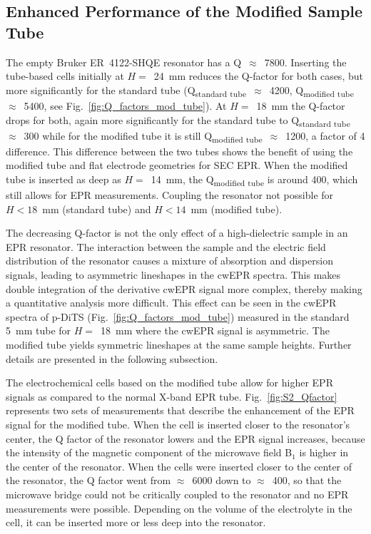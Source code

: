 \subsection{Enhanced Performance of the Modified Sample Tube}\label{Q-factor_SNR}

The empty Bruker ER~4122-SHQE resonator has a Q~$\approx$~7800. Inserting the tube-based cells initially at $H=$~24~mm reduces the Q-factor for both cases, but more significantly for the standard tube (Q\textsubscript{standard tube}~$\approx$~4200, Q\textsubscript{modified tube}~$\approx$~5400, see Fig.~\ref{fig:Q_factors_mod_tube}). At $H=$~18~mm the Q-factor drops for both, again more significantly for the standard tube to Q\textsubscript{standard tube}~$\approx$~300 while for the modified tube it is still Q\textsubscript{modified tube}~$\approx$~1200, a factor of 4 difference. This difference between the two tubes shows the benefit of using the modified tube and flat electrode geometries for SEC EPR. When the modified tube is inserted as deep as $H=$~14~mm, the Q\textsubscript{modified tube} is around 400, which still allows for EPR measurements. Coupling the resonator not possible for $H<18$~mm (standard tube) and $H<14$~mm (modified tube).

\par
The decreasing Q-factor is not the only effect of a high-dielectric sample in an EPR resonator. The interaction between the sample and the electric field distribution of the resonator causes a mixture of absorption and dispersion signals, leading to asymmetric lineshapes in the cwEPR spectra. This makes double integration of the derivative cwEPR signal more complex, thereby making a quantitative analysis more difficult. This effect can be seen in the cwEPR spectra of p-DiTS (Fig.~\ref{fig:Q_factors_mod_tube}) measured in the standard 5~mm tube for $H=$~18~mm where the cwEPR signal is asymmetric. The modified tube yields symmetric lineshapes at the same sample heights. Further details are presented in the following subsection.

\par

The electrochemical cells based on the modified tube allow for higher EPR signals as compared to the normal X-band EPR tube. Fig.~\ref{fig:S2_Qfactor} represents two sets of measurements that describe the enhancement of the EPR signal for the modified tube. When the cell is inserted closer to the resonator's center, the Q factor of the resonator lowers and the EPR signal increases, because the intensity of the magnetic component of the microwave field B$_1$ is higher in the center of the resonator. When the cells were inserted closer to the center of the resonator, the Q factor went from $\approx$~6000 down to $\approx$~400, so that the microwave bridge could not be critically coupled to the resonator and no EPR measurements were possible. Depending on the volume of the electrolyte in the cell, it can be inserted more or less deep into the resonator.

